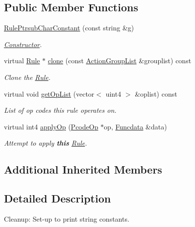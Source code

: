 \subsection*{Public Member Functions}
\begin{DoxyCompactItemize}
\item 
\mbox{\hyperlink{class_rule_ptrsub_char_constant_a8a5cf4797fb0c65cfe8d23ecfab467b3}{Rule\+Ptrsub\+Char\+Constant}} (const string \&g)
\begin{DoxyCompactList}\small\item\em \mbox{\hyperlink{class_constructor}{Constructor}}. \end{DoxyCompactList}\item 
virtual \mbox{\hyperlink{class_rule}{Rule}} $\ast$ \mbox{\hyperlink{class_rule_ptrsub_char_constant_a3e7b0e275531779c7df244f561d71dff}{clone}} (const \mbox{\hyperlink{class_action_group_list}{Action\+Group\+List}} \&grouplist) const
\begin{DoxyCompactList}\small\item\em Clone the \mbox{\hyperlink{class_rule}{Rule}}. \end{DoxyCompactList}\item 
virtual void \mbox{\hyperlink{class_rule_ptrsub_char_constant_a2d41a1c92b18f97b63c483d6e2cab2fb}{get\+Op\+List}} (vector$<$ uint4 $>$ \&oplist) const
\begin{DoxyCompactList}\small\item\em List of op codes this rule operates on. \end{DoxyCompactList}\item 
virtual int4 \mbox{\hyperlink{class_rule_ptrsub_char_constant_ab5a326704b8090e54f8afc9db135fd79}{apply\+Op}} (\mbox{\hyperlink{class_pcode_op}{Pcode\+Op}} $\ast$op, \mbox{\hyperlink{class_funcdata}{Funcdata}} \&data)
\begin{DoxyCompactList}\small\item\em Attempt to apply {\bfseries{this}} \mbox{\hyperlink{class_rule}{Rule}}. \end{DoxyCompactList}\end{DoxyCompactItemize}
\subsection*{Additional Inherited Members}


\subsection{Detailed Description}
Cleanup\+: Set-\/up to print string constants. 

